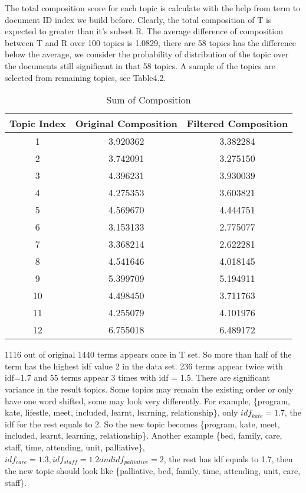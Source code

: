 \documentclass[11pt,twoside]{report}
\begin{document}
The total composition score for each topic is calculate with the help from term to document ID index we build before. 
Clearly, the total composition of T is expected to greater than it's subset R. The average difference of composition between T and R over 100 topics is 1.0829, there are 58 topics has the difference below the average, we consider the probability of distribution of the topic over the documents still significant in that 58 topics. A sample of the topics are selected from remaining topics, see Table4.2. 
\begin{table}[h]
\caption{Sum of Composition}
\centering
\begin{tabular}{c c c}
\hline\hline
Topic Index & Original Composition & Filtered Composition\\
\hline
1 & 3.920362 & 3.382284\\
2 & 3.742091 & 3.275150\\
3 & 4.396231 & 3.930039\\
4 & 4.275353 & 3.603821\\
5 & 4.569670 & 4.444751\\
6 & 3.153133 & 2.775077\\
7 & 3.368214 & 2.622281\\
8 & 4.541646 & 4.018145\\
9 & 5.399709 & 5.194911\\
10 & 4.498450 & 3.711763\\
11 & 4.255079 & 4.101976\\
12 & 6.755018 & 6.489172\\
\hline
\end{tabular}
\label{table:Topic Composition}
\end{table}

1116 out of original 1440 terms appears once in T set. So more than half of the term has the highest idf value 2 in the data set. 236 terms appear twice with idf=1.7 and 55 terms appear 3 times with idf = 1.5. There are significant variance in the result topics. Some topics may remain the existing order or only have one word shifted, some may look very differently.  For example, \{program, kate, lifestle, meet, included, learnt, learning, relationship\}, only $idf_{kate} = 1.7$, the idf for the rest equals to 2. So the new topic becomes \{program, kate, meet, included, learnt, learning, relationship\}. Another example \{bed, family, care, staff, time, attending, unit, palliative\}, $idf_{care}=1.3, idf_{staff}=1.2 and idf_{palliative}=2$, the rest has idf equals to 1.7, then the new topic should look like \{palliative, bed, family, time, attending, unit, care, staff\}. 
\end{document}
